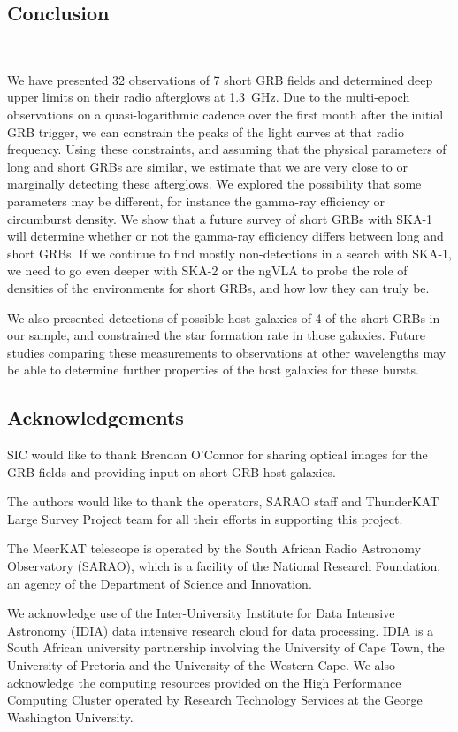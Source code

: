 \documentclass[12pt]{article}
\begin{document}
\subsection{Conclusion}
~\label{sec:conclusion5}

We have presented 32 observations of 7 short GRB fields and determined deep upper limits on their radio afterglows at 1.3~GHz. Due to the multi-epoch observations on a quasi-logarithmic cadence over the first month after the initial GRB trigger, we can constrain the peaks of the light curves at that radio frequency. Using these constraints, and assuming that the physical parameters of long and short GRBs are similar, we estimate that we are very close to or marginally detecting these afterglows. We explored the possibility that some parameters may be different, for instance the gamma-ray efficiency or circumburst density. We show that a future survey of short GRBs with SKA-1 will determine whether or not the gamma-ray efficiency differs between long and short GRBs. If we continue to find mostly non-detections in a search with SKA-1, we need to go even deeper with SKA-2 or the ngVLA to probe the role of densities of the environments for short GRBs, and how low they can truly be.

We also presented detections of possible host galaxies of 4 of the short GRBs in our sample, and constrained the star formation rate in those galaxies. Future studies comparing these measurements to observations at other wavelengths may be able to determine further properties of the host galaxies for these bursts. 


\subsection*{Acknowledgements}

SIC would like to thank Brendan O'Connor for sharing optical images for the GRB fields and providing input on short GRB host galaxies. 

The authors would like to thank the operators, SARAO staff and ThunderKAT Large Survey Project team for all their efforts in supporting this project.

The MeerKAT telescope is operated by the South African Radio Astronomy Observatory (SARAO), which is a facility of the National Research Foundation, an agency of the Department of Science and Innovation. 

We acknowledge use of the Inter-University Institute for Data Intensive Astronomy (IDIA) data intensive research cloud for data processing. IDIA is a South African university partnership involving the University of Cape Town, the University of Pretoria and the University of the Western Cape. We also acknowledge the computing resources provided on the High Performance Computing Cluster operated by Research Technology Services at the George Washington University.
\end{document}
